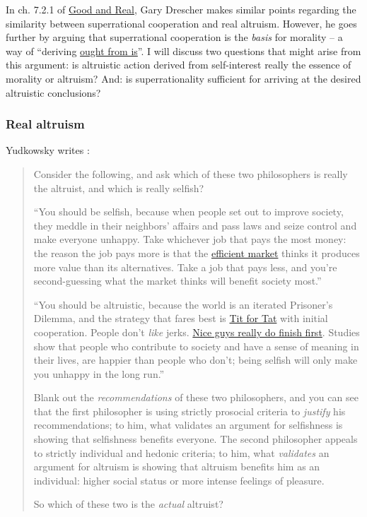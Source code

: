 In ch. 7.2.1 of
\href{https://www.gwern.net/docs/2006-drescher-goodandreal.pdf}{Good
and Real}, Gary Drescher makes similar points regarding the similarity
between superrational cooperation and real altruism. However, he goes
further by arguing that superrational cooperation is the \emph{basis}
for morality -- a way of ``deriving
\href{https://en.wikipedia.org/wiki/Is\%E2\%80\%93ought_problem}{ought
from is}''. I will discuss two questions that might arise
from this argument: is altruistic action derived from self-interest
really the essence of morality or altruism? And: is superrationality
sufficient for arriving at the desired altruistic conclusions?

\hypertarget{real-altruism}{\subsubsection{Real
altruism}\label{real-altruism}}

Yudkowsky writes \citeyear{Yudkowsky2015-tz}:

\begin{quote}
Consider the following, and ask which of these two philosophers is
really the altruist, and which is really selfish?

``You should be selfish, because when people set out to improve society,
they meddle in their neighbors' affairs and pass laws and seize control
and make everyone unhappy. Take whichever job that pays the most money:
the reason the job pays more is that the
\href{https://en.wikipedia.org/wiki/Efficient-market_hypothesis}{efficient
market} thinks it produces more value than its alternatives. Take a job
that pays less, and you're second-guessing what the market thinks will
benefit society most.''

``You should be altruistic, because the world is an iterated Prisoner's
Dilemma, and the strategy that fares best is
\href{https://en.wikipedia.org/wiki/Tit_for_tat}{Tit for Tat}
with initial cooperation. People don't \emph{like} jerks.
\href{https://en.wikipedia.org/wiki/Nice_Guys_Finish_First}{Nice
guys really do finish first}. Studies show that people who contribute
to society and have a sense of meaning in their lives, are happier than
people who don't; being selfish will only make you unhappy in the long
run.''

Blank out the \emph{recommendations} of these two philosophers, and you
can see that the first philosopher is using strictly prosocial criteria
to \emph{justify} his recommendations; to him, what validates an
argument for selfishness is showing that selfishness benefits everyone.
The second philosopher appeals to strictly individual and hedonic
criteria; to him, what \emph{validates} an argument for altruism is
showing that altruism benefits him as an individual: higher social
status or more intense feelings of pleasure.

So which of these two is the \emph{actual} altruist?
\end{quote}


